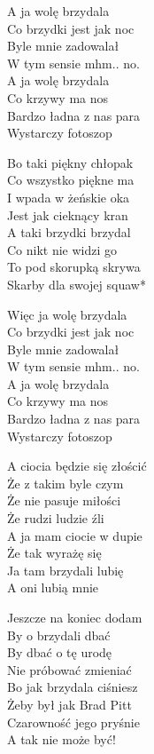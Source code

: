 \begin{text}
    A ja wolę brzydala\\
    Co brzydki jest jak noc\\
    Byle mnie zadowalał\\
    W tym sensie mhm.. no.\\
    A ja wolę brzydala\\
    Co krzywy ma nos\\
    Bardzo ładna z nas para\\
    Wystarczy fotoszop

    Bo taki piękny chłopak\\
    Co wszystko piękne ma\\
    I wpada w żeńskie oka\\
    Jest jak cieknący kran\\
    A taki brzydki brzydal\\
    Co nikt nie widzi go\\
    To pod skorupką skrywa\\
    Skarby dla swojej squaw*

    \vin Więc ja wolę brzydala\\
    \vin Co brzydki jest jak noc\\
    \vin Byle mnie zadowalał\\
    \vin W tym sensie mhm.. no.\\
    \vin A ja wolę brzydala\\
    \vin Co krzywy ma nos\\
    \vin Bardzo ładna z nas para\\
    \vin Wystarczy fotoszop

    A ciocia będzie się złościć\\
    Że z takim byle czym\\
    Że nie pasuje miłości\\
    Że rudzi ludzie źli\\
    A ja mam ciocie w dupie\\
    Że tak wyrażę się\\
    Ja tam brzydali lubię\\
    A oni lubią mnie
\end{text}
\begin{chord}

\end{chord}
\TwelvePage
\begin{text}
    Jeszcze na koniec dodam\\
    By o brzydali dbać\\
    By dbać o tę urodę\\
    Nie próbować zmieniać\\
    Bo jak brzydala ciśniesz\\
    Żeby był jak Brad Pitt\\
    Czarowność jego pryśnie\\
    A tak nie może być!
\end{text}
\begin{chord}

\end{chord}